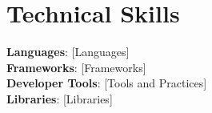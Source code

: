 \section{Technical Skills}
\begin{itemize}[leftmargin=0.15in, label={}]
  \small{\item{
    \textbf{Languages}{: [Languages]} \\
    \textbf{Frameworks}{: [Frameworks]} \\
    \textbf{Developer Tools}{: [Tools and Practices]} \\
    \textbf{Libraries}{: [Libraries]}
  }}
\end{itemize}